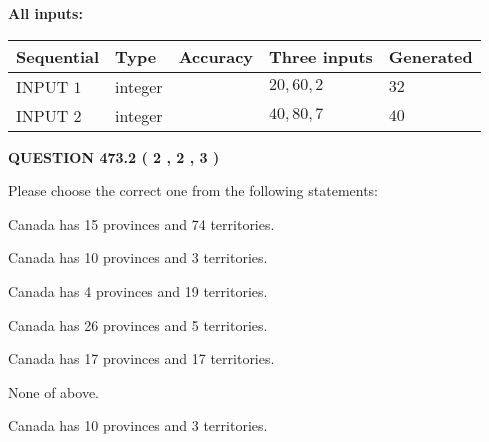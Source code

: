 \documentclass[12pt]{article}
\begin{document}
   
   
   
\noindent{}
   
   
   
   
\noindent\vspace{0.1in}\hspace{-0.08in} {\textbf{\Large{All inputs: }}}
   
   
  
  
\noindent\begin{tabular}{|l|l|l|l|l|}
\hline
 Sequential & Type & Accuracy & Three inputs & Generated \\ 
\hline
 
 
  INPUT $  1 $ & integer &  & $
 20
 , 
 60
 , 
 2
 $ & $ 32 $ 
 \\  \hline  
 
 
  INPUT $  2 $ & integer &  & $
 40
 , 
 80
 , 
 7
 $ & $ 40 $ 
 \\  \hline  
 \end{tabular}
   
   
  
\vspace{0.2in}
  
{\textbf{\Large{QUESTION
473.2 
 ( 2 , 2 , 3 )
}}}
  
  
Please choose the correct one from the following statements:
 
 
Canada has  15 provinces and  74 territories.
 
 
Canada has 10  provinces and 3 territories.
 
 
Canada has   4 provinces and  19 territories.
 
 
Canada has  26 provinces and  5 territories.
 
 
Canada has  17 provinces and  17 territories.
 
 
 None of above.
 
 
\noindent{}
 
 
Canada has 10  provinces and 3 territories.
 
 
\noindent{}
 
 
   
\end{document}

